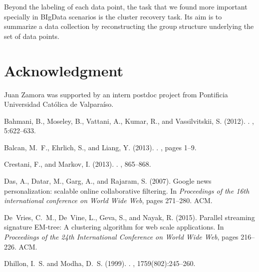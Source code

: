 \documentclass[a4paper]{article}
\begin{document}
Beyond the labeling of each data point, the task that we found more important specially in BIgData scenarios is the cluster recovery task. Its aim is to summarize a data collection by reconstructing the group structure underlying the set of data points.






\section{Acknowledgment}
Juan Zamora was supported by an intern postdoc project from Pontificia Universidad Cat\'olica de Valpara\'iso.
\clearpage 


% 
\begin{thebibliography}{}

Bahmani, B., Moseley, B., Vattani, A., Kumar, R., and Vassilvitskii, S. (2012).
.
, 5:622--633.

Balcan, M.~F., Ehrlich, S., and Liang, Y. (2013).
.
, pages 1--9.

Crestani, F., and Markov, I. (2013).
.
, 865--868.

Das, A., Datar, M., Garg, A., and Rajaram, S. (2007).
\newblock Google news personalization: scalable online collaborative filtering.
\newblock In {\em Proceedings of the 16th international conference on World
  Wide Web}, pages 271--280. ACM.

De~Vries, C.~M., De~Vine, L., Geva, S., and Nayak, R. (2015).
\newblock Parallel streaming signature {EM}-tree: A clustering algorithm for web
  scale applications.
\newblock In {\em Proceedings of the 24th International Conference on World
  Wide Web}, pages 216--226. ACM.

Dhillon, I.~S. and Modha, D.~S. (1999).
.
, 1759(802):245--260.


\end{thebibliography}
\end{document}
